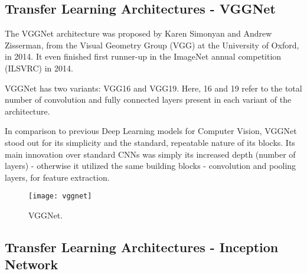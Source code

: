 	\subsection{Transfer Learning Architectures - VGGNet}

	\begin{bulletedlist}
		\item The VGGNet architecture was proposed by Karen Simonyan and Andrew Zisserman, from the Visual Geometry Group (VGG) at the
University of Oxford, in 2014. It even finished first runner-up in the ImageNet annual competition (ILSVRC) in 2014.
		\item VGGNet has two variants: VGG16 and VGG19. Here, 16 and 19 refer to the total number of convolution and fully connected layers present in each variant of the architecture.
		\item In comparison to previous Deep Learning models for Computer Vision, VGGNet stood out for its simplicity and the standard,
repeatable nature of its blocks. Its main innovation over standard CNNs was simply its increased depth (number of layers) - otherwise
it utilized the same building blocks - convolution and pooling layers, for feature extraction.
	\end{bulletedlist}

	\begin{figure}[tbh]
		\centering
		\texttt{[image: vggnet]}
		\caption[VGGNet]{VGGNet.}
		\label{fig:vggnet}
	\end{figure}


	\subsection{Transfer Learning Architectures - Inception Network}

